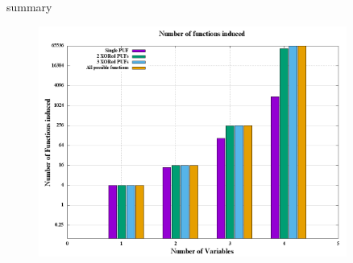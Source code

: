 \documentclass[10pt, compress]{beamer}
\begin{document}
\begin{frame}{summary}
    \begin{figure}
        \centering
        \includegraphics[width=0.9\textwidth]{figures/hist.png}
    \end{figure}
\end{frame}
\end{document}

